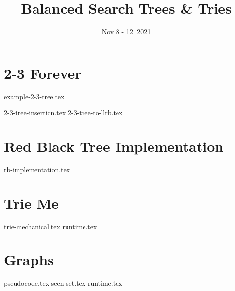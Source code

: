 \documentclass[11pt]{exam}
\title{Balanced Search Trees \& Tries}
\date{Nov 8 - 12, 2021}
\begin{document}
\maketitle

\section{2-3 Forever}

{example-2-3-tree.tex}

\begin{questions}
{2-3-tree-insertion.tex}
{2-3-tree-to-llrb.tex}
\end{questions}
\clearpage

\section{Red Black Tree Implementation}

\begin{questions}
{rb-implementation.tex}
\end{questions}
\clearpage

\section{Trie Me}
\begin{questions}
{trie-mechanical.tex}
{runtime.tex}
\end{questions}
\clearpage

\section{Graphs}
\begin{questions}
{pseudocode.tex}
{seen-set.tex}
{runtime.tex}
\end{questions}
\clearpage
\end{document}
